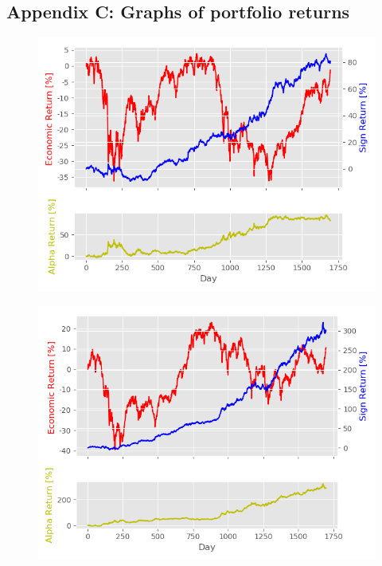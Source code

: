 \begin{appendices}
\chapter*{Appendix C: Graphs of portfolio returns} \label{appendix3}
\newpage

\begin{figure}
\centering
\begin{minipage}{.5\textwidth}
  \centering
  \includegraphics[scale=0.5]{Plot/BucketNumber1ReturnPlot.png}
  \label{fig:test1}
\end{minipage}%
\begin{minipage}{.5\textwidth}
  \centering
  \includegraphics[scale=0.5]{Plot/BucketNumber2ReturnPlot.png}
  \label{fig:test2}
\end{minipage}
\end{figure}



\end{appendices}
